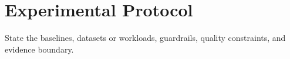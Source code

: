 \section{Experimental Protocol}

State the baselines, datasets or workloads, guardrails, quality constraints, and evidence boundary.
